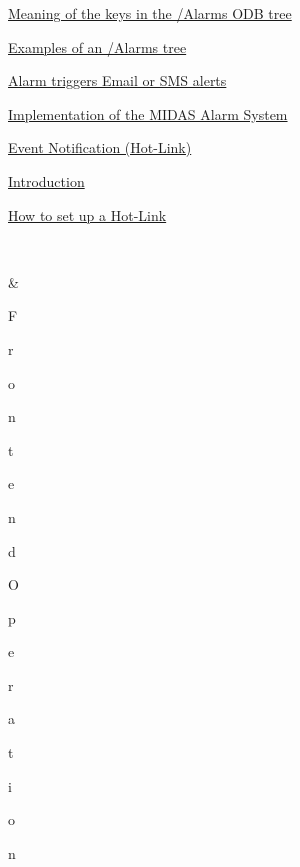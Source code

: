 \begin{TabularC}{2}
\begin{TabularC}{2}
\begin{DoxyItemize}
\begin{DoxyItemize}
\begin{DoxyItemize}
\begin{DoxyItemize}
\item \hyperlink{RC_customize_ODB_RC_explanation_of_alarms_tree}{Meaning of the keys in the /Alarms ODB tree} 
\item \hyperlink{RC_customize_ODB_RC_alarms_tree_example}{Examples of an /Alarms tree} 
\end{DoxyItemize}
\end{DoxyItemize}
\item \hyperlink{RC_customize_ODB_RC_alarms_email}{Alarm triggers Email or SMS alerts} 
\item \hyperlink{RC_customize_ODB_RC_ODB_Alarm_system_implementation}{Implementation of the MIDAS Alarm System} 
\end{DoxyItemize}\par
 
\item \hyperlink{RC_Hot_Link}{Event Notification (Hot-\/Link)} 
\begin{DoxyItemize}
\item \hyperlink{RC_Hot_Link_RC_Hot_Link_Intro}{Introduction} 
\item \hyperlink{RC_Hot_Link_RC_Example_Hot_Link}{How to set up a Hot-\/Link} 
\end{DoxyItemize}
\end{DoxyItemize}\\
\end{TabularC}
&\begin{TabularC}{2}
\hline
 \par
\par
\par
F\par
r\par
o\par
n\par
t\par
e\par
n\par
d\par
 \par
O\par
p\par
e\par
r\par
a\par
t\par
i\par
o\par
n\par
 \par
 \par
\par
\par

\end{TabularC}
\end{TabularC}
